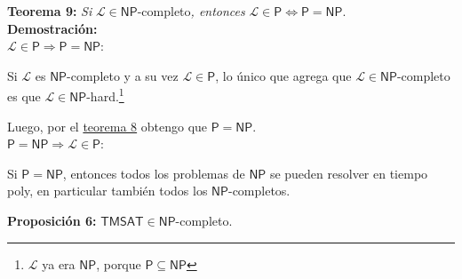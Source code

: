 \documentclass{article}
\begin{document}
\pagebreak

\begin{flushleft}
  \textbf{Teorema 9:}
  \textit{Si }$\mathcal{L} \in \mathsf{NP}$-completo\textit{, entonces} $\mathcal{L} \in \mathsf{P} \iff 
  \mathsf{P} = \mathsf{NP}$. \\[0.5em]

  \textbf{\textcolor{Mulberry}{Demostración:}} \\[0.5em]

  \textcolor{Mulberry}{$\mathcal{L} \in \mathsf{P} \Rightarrow \mathsf{P} = \mathsf{NP}$:}

  Si $\mathcal{L}$ es $\mathsf{NP}$-completo y a su vez $\mathcal{L} \in \mathsf{P}$, lo único que agrega 
  que $\mathcal{L} \in \mathsf{NP}$-completo es que $\mathcal{L} \in \mathsf{NP}$-hard.\footnote{
  $\mathcal{L}$ ya era $\mathsf{NP}$, porque $\mathsf{P} \subseteq \mathsf{NP}$}

  Luego, por el \hyperlink{teo8}{\textcolor{Rhodamine}{teorema 8}} obtengo que $\mathsf{P} = \mathsf{NP}$.
  \\[0.5em]

  \textcolor{Mulberry}{$\mathsf{P} = \mathsf{NP} \Rightarrow \mathcal{L} \in \mathsf{P}$:}

  Si $\mathsf{P} = \mathsf{NP}$, entonces todos los problemas de $\mathsf{NP}$ se pueden resolver en tiempo
  poly, en particular también todos los $\mathsf{NP}$-completos.
\end{flushleft}

\begin{flushleft}
  \textbf{Proposición 6:}
  $\mathsf{TMSAT} \in \mathsf{NP}$-completo.

  
\end{flushleft}
\end{document}
